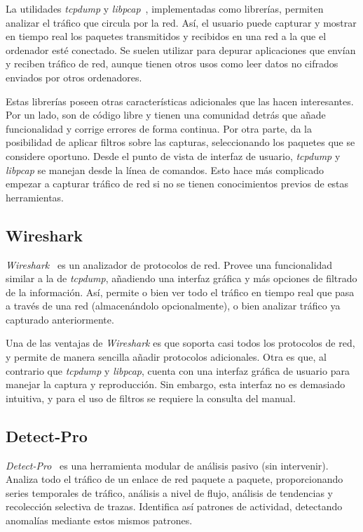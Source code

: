 La utilidades \textit{tcpdump} y \textit{libpcap}~\cite{tcpdump}, implementadas como librerías, permiten analizar el tráfico que circula por la red.
Así, el usuario puede capturar y mostrar en tiempo real los paquetes transmitidos y recibidos en una red a la que el ordenador esté conectado.
Se suelen utilizar para depurar aplicaciones que envían y reciben tráfico de red, aunque tienen otros usos como leer datos no cifrados enviados por otros ordenadores.

Estas librerías poseen otras características adicionales que las hacen interesantes.
Por un lado, son de código libre y tienen una comunidad detrás que añade funcionalidad y corrige errores de forma continua.
Por otra parte, da la posibilidad de aplicar filtros sobre las capturas, seleccionando los paquetes que se considere oportuno.
Desde el punto de vista de interfaz de usuario, \textit{tcpdump} y \textit{libpcap} se manejan desde la línea de comandos.
Esto hace más complicado empezar a capturar tráfico de red si no se tienen conocimientos previos de estas herramientas.

\subsection*{Wireshark\label{sec:eda:wireshark}}

\textit{Wireshark}~\cite{wireshark} es un analizador de protocolos de red.
Provee una funcionalidad similar a la de \textit{tcpdump}, añadiendo una interfaz gráfica y más opciones de filtrado de la información.
Así, permite o bien ver todo el tráfico en tiempo real que pasa a través de una red (almacenándolo opcionalmente), o bien analizar tráfico ya capturado anteriormente.

Una de las ventajas de \textit{Wireshark} es que soporta casi todos los protocolos de red, y permite de manera sencilla añadir protocolos adicionales.
Otra es que, al contrario que \textit{tcpdump} y \textit{libpcap}, cuenta con una interfaz gráfica de usuario para manejar la captura y reproducción.
Sin embargo, esta interfaz no es demasiado intuitiva, y para el uso de filtros se requiere la consulta del manual.

\subsection*{Detect-Pro\label{sec:eda:detectpro}}

\textit{Detect-Pro}~\cite{detectpro} es una herramienta modular de análisis pasivo (sin intervenir).
Analiza todo el tráfico de un enlace de red paquete a paquete, proporcionando series temporales de tráfico, análisis a nivel de flujo, análisis de tendencias y recolección selectiva de \glspl{traza}.
Identifica así patrones de actividad, detectando anomalías mediante estos mismos patrones.

